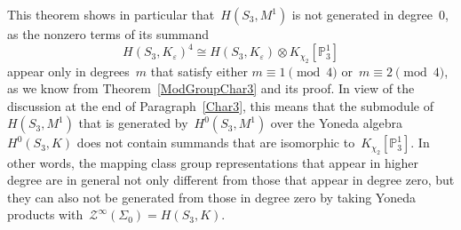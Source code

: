 \documentclass[12pt]{article}
\theoremstyle{definition}
\theoremstyle{break}
\renewcommand{\P}{\mathbb{P}}
\renewcommand{\1}{\mathbbm{1}}
\newcommand{\TFT}{\mathcal{Z}}
\renewcommand{\P}{\mathbb{P}}
\newcommand{\ot}{\mathbin{\otimes}}
\begin{document}
This theorem shows in particular that~$H(S_3, M^1)$ is not generated in degree~$0$, as the nonzero terms of its summand
\[H(S_3, K_\varepsilon)^4 \cong H(S_3, K_\varepsilon) \ot K_{\chi_2}[\P_3^{1}]\] appear only in degrees~$m$ that satisfy either \mbox{$m \equiv 1 \pmod{4}$}
or~$m \equiv 2 \pmod{4}$, as we know from Theorem~\ref{ModGroupChar3} and its proof. In view of the discussion at the end of Paragraph~\ref{Char3}, this means that the submodule of~$H(S_3, M^1)$ that is generated by~$H^0(S_3, M^1)$ over the Yoneda algebra~$H^0(S_3, K)$ does not contain summands that are isomorphic to~$K_{\chi_2}[\P_3^{1}]$. In other words, the mapping class group representations that appear in higher degree are in general not only different from those that appear in degree zero, but they can also not be generated from those in degree zero by taking Yoneda products with~$\TFT^\infty(\Sigma_0) = H(S_3, K)$.
\end{document}
